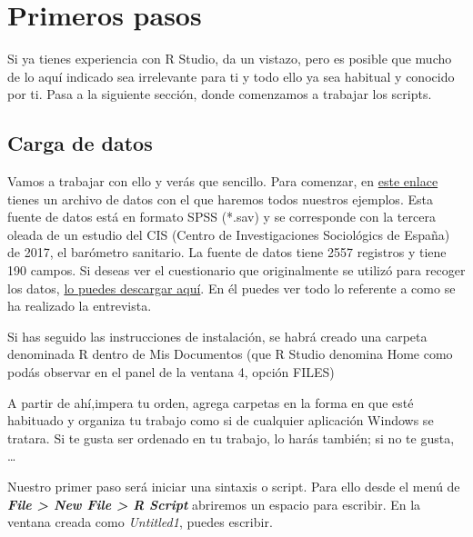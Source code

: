\documentclass[
]{book}
\begin{document}
\hypertarget{primeros-pasos}{%
\section{Primeros pasos}\label{primeros-pasos}}

Si ya tienes experiencia con R Studio, da un vistazo, pero es posible que mucho de lo aquí indicado sea irrelevante para ti y todo ello ya sea habitual y conocido por ti. Pasa a la siguiente sección, donde comenzamos a trabajar los scripts.

\hypertarget{carga-de-datos}{%
\subsection{Carga de datos}\label{carga-de-datos}}

Vamos a trabajar con ello y verás que sencillo. Para comenzar, en \href{https://drive.google.com/uc?export=download\&id=1JjevbQjzGc1NMyR7qf7bbvtbMyK8Pvhr}{este enlace} tienes un archivo de datos con el que haremos todos nuestros ejemplos. Esta fuente de datos está en formato SPSS (*.sav) y se corresponde con la tercera oleada de un estudio del CIS (Centro de Investigaciones Sociológics de España) de 2017, el barómetro sanitario.
La fuente de datos tiene 2557 registros y tiene 190 campos. Si deseas ver el cuestionario que originalmente se utilizó para recoger los datos, \href{https://drive.google.com/uc?export=download\&id=1AUUI-1isOmKB1ovR4MRoqMj2Fp7Re2f2}{lo puedes descargar aquí}. En él puedes ver todo lo referente a como se ha realizado la entrevista.

Si has seguido las instrucciones de instalación, se habrá creado una carpeta denominada R dentro de Mis Documentos (que R Studio denomina Home como podás observar en el panel de la ventana 4, opción FILES)

A partir de ahí,impera tu orden, agrega carpetas en la forma en que esté habituado y organiza tu trabajo como si de cualquier aplicación Windows se tratara. Si te gusta ser ordenado en tu trabajo, lo harás también; si no te gusta, \ldots{}

Nuestro primer paso será iniciar una sintaxis o script. Para ello desde el menú de \textbf{\emph{File \textgreater{} New File \textgreater{} R Script}} abriremos un espacio para escribir. En la ventana creada como \emph{Untitled1}, puedes escribir.
\end{document}
